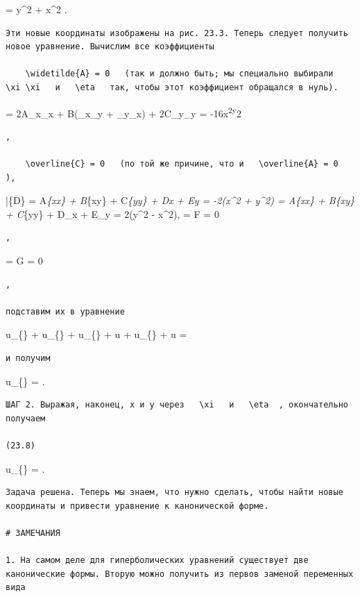 \documentclass[
  ukrainian,
]{article}
\begin{document}
\eta = y\^{}2 + x\^{}2 .

\begin{verbatim}
Эти новые координаты изображены на рис. 23.3. Теперь следует получить новое уравнение. Вычислим все коэффициенты

    \widetilde{A} = 0   (так и должно быть; мы специально выбирали   \xi \xi   и   \eta   так, чтобы этот коэффициент обращался в нуль).
\end{verbatim}

 = 2A\xi\_x\eta\_x + B(\xi\_x\eta\_y + \xi\_y\eta\_x) +
2C\xi\_y\eta\_y = -16x\textsuperscript{2y}2

\begin{verbatim}
,

    \overline{C} = 0   (по той же причине, что и   \overline{A} = 0  ),
\end{verbatim}

\bar\{D\} = A\xi\emph{\{xx\} + B\xi}\{xy\} + C\xi\emph{\{yy\} +
D\xi\emph{x + E\xi\emph{y = -2(x\^{}2 + y\^{}2)  =
A\eta}\{xx\} + B\eta}\{xy\} + C\eta}\{yy\} + D\eta\_x + E\eta\_y =
2(y\^{}2 - x\^{}2),  = F = 0

\begin{verbatim}
,
\end{verbatim}

 = G = 0

\begin{verbatim}
,

подставим их в уравнение
\end{verbatim}

u\_\{\xi\xi\} + u\_\{\xi\eta\} +
u\_\{\eta\eta\} + u + u\_\{\eta\} +
u = 

\begin{verbatim}
и получим
\end{verbatim}

u\_\{\xi\eta\} =
.

\begin{verbatim}
ШАГ 2. Выражая, наконец, x и y через   \xi   и   \eta  , окончательно получаем

(23.8)
\end{verbatim}

u\_\{\xi\eta\} = .

\begin{verbatim}
Задача решена. Теперь мы знаем, что нужно сделать, чтобы найти новые координаты и привести уравнение к канонической форме.

# ЗАМЕЧАНИЯ

1. На самом деле для гиперболических уравнений существует две канонические формы. Вторую можно получить из первов заменой переменных вида
\end{verbatim}
\end{document}
